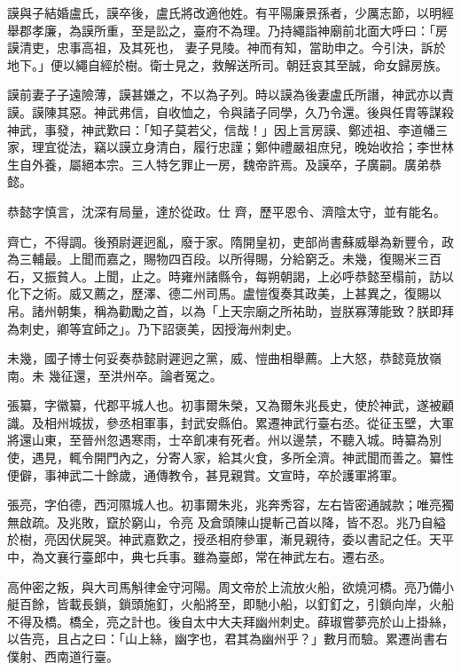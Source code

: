 \begin{pinyinscope}
 謨與子結婚盧氏，謨卒後，盧氏將改適他姓。有平陽廉景孫者，少厲志節，以明經舉郡孝廉，為謨所重，至是訟之，臺府不為理。乃持繩詣神廟前北面大呼曰：「房謨清吏，忠事高祖，及其死也，
 妻子見陵。神而有知，當助申之。今引決，訴於地下。」便以繩自經於樹。衛士見之，救解送所司。朝廷哀其至誠，命女歸房族。



 謨前妻子子遠險薄，謨甚嫌之，不以為子列。時以謨為後妻盧氏所譖，神武亦以責謨。謨陳其惡。神武弗信，自收恤之，令與諸子同學，久乃令還。後與任胄等謀殺神武，事發，神武歎曰：「知子莫若父，信哉！」因上言房謨、鄭述祖、李道幡三家，理宜從法，竊以謨立身清白，履行忠謹；鄭仲禮嚴祖庶兒，晚始收拾；李世林生自外養，屬絕本宗。三人特乞罪止一房，魏帝許焉。及謨卒，子廣嗣。廣弟恭懿。



 恭懿字慎言，沈深有局量，達於從政。仕
 齊，歷平恩令、濟陰太守，並有能名。



 齊亡，不得調。後預尉遲迥亂，廢于家。隋開皇初，吏部尚書蘇威舉為新豐令，政為三輔最。上聞而嘉之，賜物四百段。以所得賜，分給窮乏。未幾，復賜米三百石，又振貧人。上聞，止之。時雍州諸縣令，每朔朝謁，上必呼恭懿至榻前，訪以化下之術。威又薦之，歷澤、德二州司馬。盧愷復奏其政美，上甚異之，復賜以帛。諸州朝集，稱為勸勵之首，以為「上天宗廟之所祐助，豈朕寡薄能致？朕即拜為刺史，卿等宜師之」。乃下詔褒美，因授海州刺史。



 未幾，國子博士何妥奏恭懿尉遲迥之黨，威、愷曲相舉薦。上大怒，恭懿竟放嶺南。未
 幾征還，至洪州卒。論者冤之。



 張纂，字徽纂，代郡平城人也。初事爾朱榮，又為爾朱兆長史，使於神武，遂被顧識。及相州城拔，參丞相軍事，封武安縣伯。累遷神武行臺右丞。從征玉壁，大軍將還山東，至晉州忽遇寒雨，士卒飢凍有死者。州以邊禁，不聽入城。時纂為別使，遇見，輒令開門內之，分寄人家，給其火食，多所全濟。神武聞而善之。纂性便僻，事神武二十餘歲，通傳教令，甚見親賞。文宣時，卒於護軍將軍。



 張亮，字伯德，西河隰城人也。初事爾朱兆，兆奔秀容，左右皆密通誠款；唯亮獨無啟疏。及兆敗，竄於窮山，令亮
 及倉頭陳山提斬己首以降，皆不忍。兆乃自縊於樹，亮因伏屍哭。神武嘉歎之，授丞相府參軍，漸見親待，委以書記之任。天平中，為文襄行臺郎中，典七兵事。雖為臺郎，常在神武左右。遷右丞。



 高仲密之叛，與大司馬斛律金守河陽。周文帝於上流放火船，欲燒河橋。亮乃備小艇百餘，皆載長鎖，鎖頭施釘，火船將至，即馳小船，以釘釘之，引鎖向岸，火船不得及橋。橋全，亮之計也。後自太中大夫拜幽州刺史。薛琡嘗夢亮於山上掛絲，以告亮，且占之曰：「山上絲，幽字也，君其為幽州乎？」數月而驗。累遷尚書右僕射、西南道行臺。




\end{pinyinscope}
